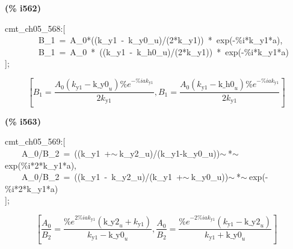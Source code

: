 \documentclass[fleqn]{article}
\begin{document}
\noindent
\begin{minipage}[t]{4.000000em}\color{red}\bfseries
(\% i562)	
\end{minipage}
\begin{minipage}[t]{\textwidth}\color{blue}
cmt\_ch05\_568:[\\
\ \ \ \ \ \ \ \ B\_1\ =\ A\_0*((k\_y1\ -\ k\_y0\_u)/(2*k\_y1))\ *\ exp(-\%i*k\_y1*a),\\
\ \ \ \ \ \ \ \ B\_1\ =\ A\_0\ *\ ((k\_y1\ -\ k\_h0\_u)/(2*k\_y1))\ *\ exp(-\%i*k\_y1*a)\\
];
\end{minipage}
\[\displaystyle \tag{\% o562} 
\left[ {B_1}=\frac{{A_0} \left( {k_{\ensuremath{\mathrm{y1}}}}-{{\ensuremath{\mathrm{k\_ y0}}}_u}\right)  {{\% e}^{-\% i a {k_{\ensuremath{\mathrm{y1}}}}}}}{2 {k_{\ensuremath{\mathrm{y1}}}}}\operatorname{,}{B_1}=\frac{{A_0} \left( {k_{\ensuremath{\mathrm{y1}}}}-{{\ensuremath{\mathrm{k\_ h0}}}_u}\right)  {{\% e}^{-\% i a {k_{\ensuremath{\mathrm{y1}}}}}}}{2 {k_{\ensuremath{\mathrm{y1}}}}}\right] \mbox{}
\]


\noindent
\begin{minipage}[t]{4.000000em}\color{red}\bfseries
(\% i563)	
\end{minipage}
\begin{minipage}[t]{\textwidth}\color{blue}
cmt\_ch05\_569:[\\
\ \ \ \ A\_0/B\_2\ =\ ((k\_y1\ +\ensuremath{\sim\ }k\_y2\_u)/(k\_y1-k\_y0\_u))\ensuremath{\sim\ }*\ensuremath{\sim\ }exp(\%i*2*k\_y1*a),\\
\ \ \ \ A\_0/B\_2\ =\ ((k\_y1\ -\ k\_y2\_u)/(k\_y1\ +\ensuremath{\sim\ }k\_y0\_u))\ensuremath{\sim\ }*\ensuremath{\sim\ }exp(-\%i*2*k\_y1*a)\\
];
\end{minipage}
\[\displaystyle \tag{\% o563} 
\left[ \frac{{A_0}}{{B_2}}=\frac{{{\% e}^{2 \% i a {k_{\ensuremath{\mathrm{y1}}}}}} \left( {{\ensuremath{\mathrm{k\_ y2}}}_u}+{k_{\ensuremath{\mathrm{y1}}}}\right) }{{k_{\ensuremath{\mathrm{y1}}}}-{{\ensuremath{\mathrm{k\_ y0}}}_u}}\operatorname{,}\frac{{A_0}}{{B_2}}=\frac{{{\% e}^{-2 \% i a {k_{\ensuremath{\mathrm{y1}}}}}} \left( {k_{\ensuremath{\mathrm{y1}}}}-{{\ensuremath{\mathrm{k\_ y2}}}_u}\right) }{{k_{\ensuremath{\mathrm{y1}}}}+{{\ensuremath{\mathrm{k\_ y0}}}_u}}\right] \mbox{}
\]
\end{document}
